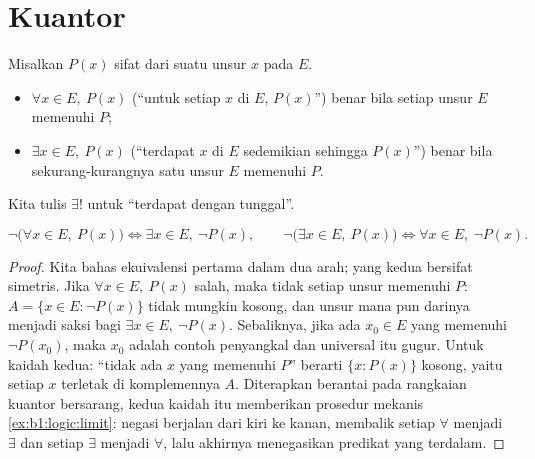 \section{Kuantor}

\begin{definition}[Kuantor]\label{def:b1:logic:quantifiers}
Misalkan $P(x)$ sifat dari suatu unsur $x$ pada  $E$.
\begin{itemize}
  \item $\forall x \in E,\ P(x)$ (``untuk setiap $x$ di $E$, $P(x)$'')
        benar bila setiap unsur $E$ memenuhi $P$;
  \item $\exists x \in E,\ P(x)$ (``terdapat $x$ di $E$ sedemikian
        sehingga $P(x)$'') benar bila sekurang-kurangnya satu unsur
        $E$ memenuhi $P$.
\end{itemize}
Kita tulis $\exists!$ untuk ``terdapat dengan tunggal''.
\end{definition}

\begin{proposition}\label{prop:b1:logic:negquant}
\[
\lnot\bigl(\forall x \in E,\ P(x)\bigr) \iff
\exists x \in E,\ \lnot P(x),
\qquad
\lnot\bigl(\exists x \in E,\ P(x)\bigr) \iff
\forall x \in E,\ \lnot P(x).
\]
\end{proposition}

\begin{proof}
Kita bahas ekuivalensi pertama dalam dua arah; yang kedua bersifat
simetris. Jika $\forall x \in E,\ P(x)$ salah, maka tidak setiap unsur
memenuhi $P$:  $A = \{x \in E : \lnot P(x)\}$ tidak mungkin
kosong, dan unsur mana pun darinya menjadi saksi bagi $\exists x \in
E,\ \lnot P(x)$. Sebaliknya, jika ada $x_0 \in E$ yang memenuhi $\lnot
P(x_0)$, maka $x_0$ adalah contoh penyangkal dan  universal
itu gugur. Untuk kaidah kedua: ``tidak ada $x$ yang memenuhi $P$''
berarti  $\{x : P(x)\}$ kosong, yaitu setiap $x$ terletak di
komplemennya $A$. Diterapkan berantai pada rangkaian kuantor
bersarang, kedua kaidah itu memberikan prosedur mekanis
\cref{ex:b1:logic:limit}: negasi berjalan dari kiri ke kanan,
membalik setiap $\forall$ menjadi
$\exists$ dan setiap $\exists$ menjadi $\forall$, lalu akhirnya
menegasikan predikat yang terdalam.
\end{proof}

